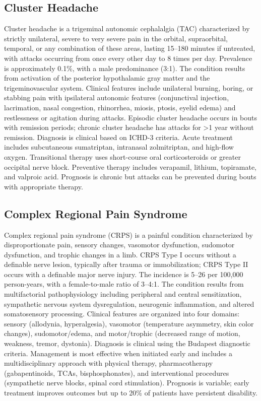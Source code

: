 \subsection{Cluster Headache}
\label{sec:Cluster Headache}
Cluster headache is a trigeminal autonomic cephalalgia (TAC) characterized by strictly unilateral, severe to very severe pain in the orbital, supraorbital, temporal, or any combination of these areas, lasting 15--180 minutes if untreated, with attacks occurring from once every other day to 8 times per day. Prevalence is approximately 0.1\%, with a male predominance (3:1). The condition results from activation of the posterior hypothalamic gray matter and the trigeminovascular system. Clinical features include unilateral burning, boring, or stabbing pain with ipsilateral autonomic features (conjunctival injection, lacrimation, nasal congestion, rhinorrhea, miosis, ptosis, eyelid edema) and restlessness or agitation during attacks. Episodic cluster headache occurs in bouts with remission periods; chronic cluster headache has attacks for >1 year without remission. Diagnosis is clinical based on ICHD-3 criteria. Acute treatment includes subcutaneous sumatriptan, intranasal zolmitriptan, and high-flow oxygen. Transitional therapy uses short-course oral corticosteroids or greater occipital nerve block. Preventive therapy includes verapamil, lithium, topiramate, and valproic acid. Prognosis is chronic but attacks can be prevented during bouts with appropriate therapy.

\subsection{Complex Regional Pain Syndrome}
\label{sec:Complex Regional Pain Syndrome}
Complex regional pain syndrome (CRPS) is a painful condition characterized by disproportionate pain, sensory changes, vasomotor dysfunction, sudomotor dysfunction, and trophic changes in a limb. CRPS Type I occurs without a definable nerve lesion, typically after trauma or immobilization; CRPS Type II occurs with a definable major nerve injury. The incidence is 5--26 per 100,000 person-years, with a female-to-male ratio of 3--4:1. The condition results from multifactorial pathophysiology including peripheral and central sensitization, sympathetic nervous system dysregulation, neurogenic inflammation, and altered somatosensory processing. Clinical features are organized into four domains: sensory (allodynia, hyperalgesia), vasomotor (temperature asymmetry, skin color changes), sudomotor/edema, and motor/trophic (decreased range of motion, weakness, tremor, dystonia). Diagnosis is clinical using the Budapest diagnostic criteria. Management is most effective when initiated early and includes a multidisciplinary approach with physical therapy, pharmacotherapy (gabapentinoids, TCAs, bisphosphonates), and interventional procedures (sympathetic nerve blocks, spinal cord stimulation). Prognosis is variable; early treatment improves outcomes but up to 20\% of patients have persistent disability.

